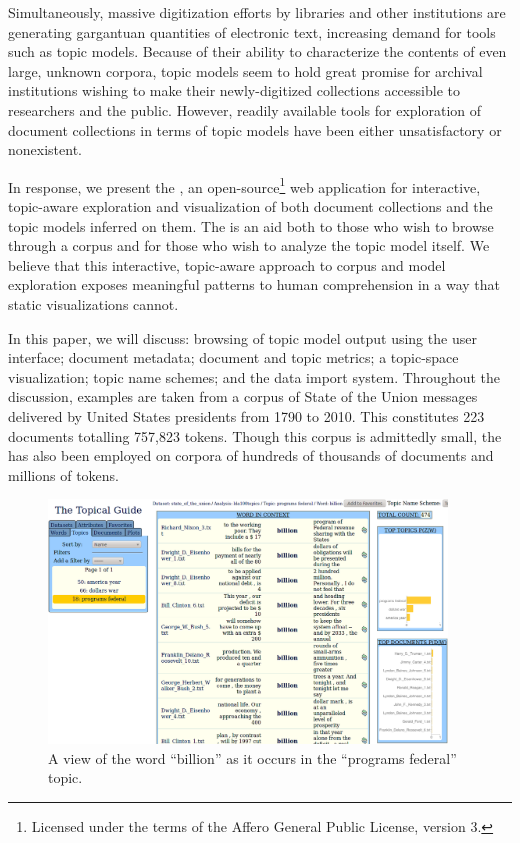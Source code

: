 \documentclass[11pt]{article}
\newcommand{\comments}[1]{}
\begin{document}
Simultaneously, massive digitization efforts by libraries and other institutions
are generating gargantuan quantities of electronic text, increasing demand for tools such as
topic models. Because of their ability to characterize the contents of even large, unknown
corpora, topic models seem to hold great promise for archival
institutions wishing to make their newly-digitized collections accessible to
researchers and the public. However, readily available tools for exploration of 
document collections in terms of topic models have been either unsatisfactory
or nonexistent.

In response, we present the \tool, an open-source\footnote{Licensed under the terms of the Affero
General Public License, version 3.} web application for interactive,
topic-aware exploration and visualization of both document collections and the
topic models inferred on them.\comments{\footnote{Further information on the project, including %
source code access and a live demonstration server, can be found
at \texttt{\projecturl}.}} The \tool{} is an aid both to those who wish to
browse through a corpus and for those who wish to analyze the topic model itself.
We believe that this interactive, topic-aware approach to corpus and model exploration
exposes meaningful patterns to human comprehension in a way that static visualizations cannot.

In this paper, we will discuss: browsing of topic model output using the \tool{} user interface\comments{, as in \newcite{gardner_browser_2010}}; %
document metadata; document and topic metrics; a topic-space visualization;
topic name schemes; and the data import
system. Throughout the discussion, examples are taken from a
corpus of State of the Union messages delivered by United States presidents
from 1790 to 2010. This constitutes 223 documents totalling 757,823 tokens.
Though this corpus is admittedly small, the \tool{} has also been employed
on corpora of hundreds of thousands of documents and millions of tokens.

\begin{figure}[t]
 \centering
 \includegraphics[width=400px,keepaspectratio=true]{./topic_word_view3.png}
 \caption{A view of the word ``billion'' as it occurs in the ``programs federal'' topic.}
 \label{fig:topic_word}
\end{figure}
\end{document}
